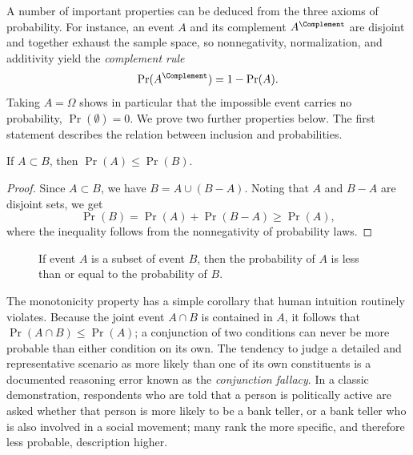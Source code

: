A number of important properties can be deduced from the three axioms of probability.
For instance, an event $A$ and its complement $A^{\Complement}$ are disjoint and together exhaust the sample space, so nonnegativity, normalization, and additivity yield the \emph{complement rule}
\begin{equation*}
\Pr (A^{\Complement}) = 1 - \Pr (A) .
\end{equation*}
Taking $A = \Omega$ shows in particular that the impossible event carries no probability, $\Pr (\emptyset) = 0$.
We prove two further properties below.
The first statement describes the relation between inclusion and probabilities.
\begin{proposition}
If $A \subset B$, then $\Pr (A) \leq \Pr (B)$.
\end{proposition}
\begin{proof}
Since $A \subset B$, we have $B = A \cup (B - A)$.
Noting that $A$ and $B - A$ are disjoint sets, we get
\begin{equation*}
\Pr (B) = \Pr (A) + \Pr (B - A) \geq \Pr (A) ,
\end{equation*}
where the inequality follows from the nonnegativity of probability laws.
\end{proof}
\begin{figure}[htb!]
\begin{center}
\caption{If event $A$ is a subset of event $B$, then the probability of $A$ is less than or equal to the probability of $B$.}
\end{center}
\end{figure}

The monotonicity property has a simple corollary that human intuition routinely violates.
Because the joint event $A \cap B$ is contained in $A$, it follows that $\Pr (A \cap B) \leq \Pr (A)$;
a conjunction of two conditions can never be more probable than either condition on its own.
The tendency to judge a detailed and representative scenario as more likely than one of its own constituents is a documented reasoning error known as the \emph{conjunction fallacy}.
In a classic demonstration, respondents who are told that a person is politically active are asked whether that person is more likely to be a bank teller, or a bank teller who is also involved in a social movement;
many rank the more specific, and therefore less probable, description higher.

